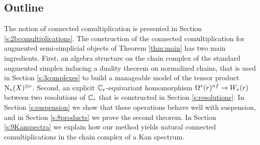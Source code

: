 

\subsection*{Outline} 
The notion of connected comultiplication is presented in Section \ref{s:2bcomultiplications}. The construction of the connected comultiplication for augmented semi-simplicial objects of Theorem \ref{thm:main} has two main ingredients. First, an algebra structure on the chain complex of the standard augmented simplex inducing a duality theorem on normalized chains, that is used in Section \ref{s:3complexes} to build a manageable model of the tensor product $\operatorname{N}_*(X)^{\otimes r}$. Second, an explicit $\mathbb{C}_r$-equivariant homomorphism $\Omega^*(r)^{nf}\to W_*(r)$ between two resolutions of $\mathbb{C}_r$ that is constructed in Section \ref{s:resolutions}. In Section \ref{s:suspension} we show that these operations behave well with suspension, and in Section \ref{s:8products} we prove the second theorem. In Section \ref{s:9Kanspectra} we explain how our method yields natural connected comultiplications in the chain complex of a Kan spectrum.




